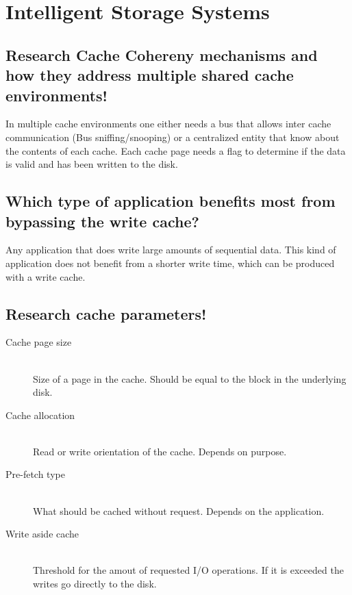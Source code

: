 \section{Intelligent Storage Systems} %
\label{sec:intelligent_storage_systems}

\subsection{Research Cache Cohereny mechanisms and how they address multiple shared cache environments!} %
\label{sub:research_cache_cohereny_mechanisms_and_how_they_address_multiple_shared_cache_environments}
	In multiple cache environments one either needs a bus that allows inter cache communication (Bus sniffing/snooping)
	or a centralized entity that know about the contents of each cache.
	Each cache page needs a flag to determine if the data is valid
	and has been written to the disk.

\subsection{Which type of application benefits most from bypassing the write cache?} %
\label{sub:which_type_of_application_benefits_most_from_bypassing_the_write_cache_}
	Any application that does write large amounts of sequential data.
	This kind of application does not benefit from a shorter write time,
	which can be produced with a write cache.

\subsection{Research cache parameters!} %
\label{sub:research_cache_parameters_}
	\begin{description}
		\item[Cache page size] \hfill \\
			Size of a page in the cache.
			Should be equal to the block in the underlying disk.
		\item[Cache allocation] \hfill \\
			Read or write orientation of the cache.
			Depends on purpose.
		\item[Pre-fetch type] \hfill \\
			What should be cached without request.
			Depends on the application.
		\item[Write aside cache] \hfill \\
			Threshold for the amout of requested I/O operations.
			If it is exceeded the writes go directly to the disk.
	\end{description}

